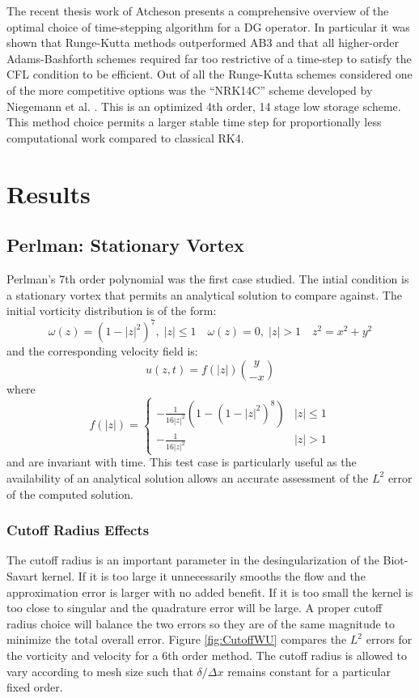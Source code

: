 \documentclass[]{aiaa-tc}%
\newcommand{\ben}[1]{\begin{equation}\label{#1}}
\newcommand{\ee}{\end{equation}}
\begin{document}
The recent thesis work of Atcheson \cite{Reid} presents a comprehensive overview of the optimal choice of time-stepping algorithm for a DG operator. In particular it was shown that Runge-Kutta methods outperformed AB3 and that all higher-order Adams-Bashforth schemes required far too restrictive of a time-step to satisfy the CFL condition to be efficient. Out of all the Runge-Kutta schemes considered one of the more competitive options was the ``NRK14C'' scheme developed by Niegemann et al. \cite{Niegemann}. This is an optimized 4th order, 14 stage low storage scheme. This method choice permits a larger stable time step for proportionally less computational work compared to classical RK4.

\section{Results}

\subsection{Perlman: Stationary Vortex}
Perlman's 7th order polynomial  \cite{Perlman1985} was the first case studied. The intial condition is a stationary vortex that permits an analytical solution to compare against. The initial vorticity distribution is of the form:
\ben{PerlW} \omega(z)=(1-|z|^2)^7, \; |z|\leq 1  \quad \omega(z)=0, \;|z|>1 \quad z^2=x^2+y^2 \ee
and the corresponding velocity field is:
\ben{PerlU} u(z,t)=f(|z|)\binom{y}{-x} \ee
where
\[
f(|z|)=
\begin{cases}
    -\frac{1}{16|z|^2}(1-(1-|z|^2)^8)	& |z| \leq 1\\
    -\frac{1}{16|z|^2} 			& |z|>1
\end{cases}
\]
and are invariant with time. This test case is particularly useful as the availability of an analytical solution allows an accurate assessment of the $L^2$ error of the computed solution.

\subsubsection{Cutoff Radius Effects}\label{Pcutoff}
The cutoff radius is an important parameter in the desingularization of the Biot-Savart kernel. If it is too large it unnecessarily smooths the flow and the approximation error is larger with no added benefit. If it is too small the kernel is too close to singular and the quadrature error will be large. A proper cutoff radius choice will balance the two errors so they are of the same magnitude to minimize the total overall error. Figure \ref{fig:CutoffWU} compares the $L^2$ errors for the vorticity and velocity for a 6th order method. The cutoff radius is allowed to vary according to mesh size such that $\delta/\Delta x$ remains constant for a particular fixed order.
\end{document}

